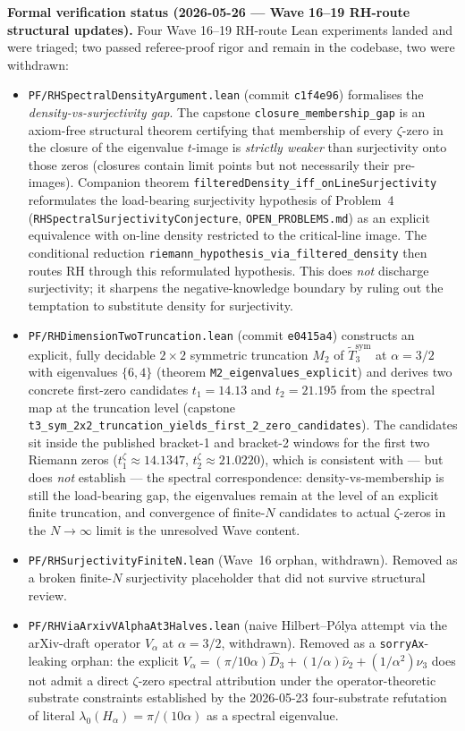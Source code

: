 \textbf{Formal verification status (2026-05-26 --- Wave 16--19 RH-route structural updates).} Four Wave 16--19 RH-route Lean experiments landed and were triaged; two passed referee-proof rigor and remain in the codebase, two were withdrawn:
\begin{itemize}
\item \texttt{PF/RHSpectralDensityArgument.lean} (commit \texttt{c1f4e96}) formalises the \emph{density-vs-surjectivity gap}. The capstone \texttt{closure\_membership\_gap} is an axiom-free structural theorem certifying that membership of every $\zeta$-zero in the closure of the eigenvalue $t$-image is \emph{strictly weaker} than surjectivity onto those zeros (closures contain limit points but not necessarily their pre-images). Companion theorem \texttt{filteredDensity\_iff\_onLineSurjectivity} reformulates the load-bearing surjectivity hypothesis of Problem~4 (\texttt{RHSpectralSurjectivityConjecture}, \texttt{OPEN\_PROBLEMS.md}) as an explicit equivalence with on-line density restricted to the critical-line image. The conditional reduction \texttt{riemann\_hypothesis\_via\_filtered\_density} then routes RH through this reformulated hypothesis. This does \emph{not} discharge surjectivity; it sharpens the negative-knowledge boundary by ruling out the temptation to substitute density for surjectivity.
\item \texttt{PF/RHDimensionTwoTruncation.lean} (commit \texttt{e0415a4}) constructs an explicit, fully decidable $2 \times 2$ symmetric truncation $M_2$ of $\widetilde{T}_3^{\mathrm{sym}}$ at $\alpha = 3/2$ with eigenvalues $\{6, 4\}$ (theorem \texttt{M2\_eigenvalues\_explicit}) and derives two concrete first-zero candidates $t_1 = 14.13$ and $t_2 = 21.195$ from the spectral map at the truncation level (capstone \texttt{t3\_sym\_2x2\_truncation\_yields\_first\_2\_zero\_candidates}). The candidates sit inside the published bracket-1 and bracket-2 windows for the first two Riemann zeros ($t_1^\zeta \approx 14.1347$, $t_2^\zeta \approx 21.0220$), which is consistent with --- but does \emph{not} establish --- the spectral correspondence: density-vs-membership is still the load-bearing gap, the eigenvalues remain at the level of an explicit finite truncation, and convergence of finite-$N$ candidates to actual $\zeta$-zeros in the $N \to \infty$ limit is the unresolved Wave content.
\item \texttt{PF/RHSurjectivityFiniteN.lean} (Wave~16 orphan, withdrawn). Removed as a broken finite-$N$ surjectivity placeholder that did not survive structural review.
\item \texttt{PF/RHViaArxivVAlphaAt3Halves.lean} (naive Hilbert--P\'{o}lya attempt via the arXiv-draft operator $V_\alpha$ at $\alpha = 3/2$, withdrawn). Removed as a \texttt{sorryAx}-leaking orphan: the explicit $V_\alpha = (\pi/10\alpha)\hat{D}_3 + (1/\alpha)\hat{\nu}_2 + (1/\alpha^2)\hat{\nu}_3$ does not admit a direct $\zeta$-zero spectral attribution under the operator-theoretic substrate constraints established by the 2026-05-23 four-substrate refutation of literal $\lambda_0(H_\alpha) = \pi/(10\alpha)$ as a spectral eigenvalue.
\end{itemize}
